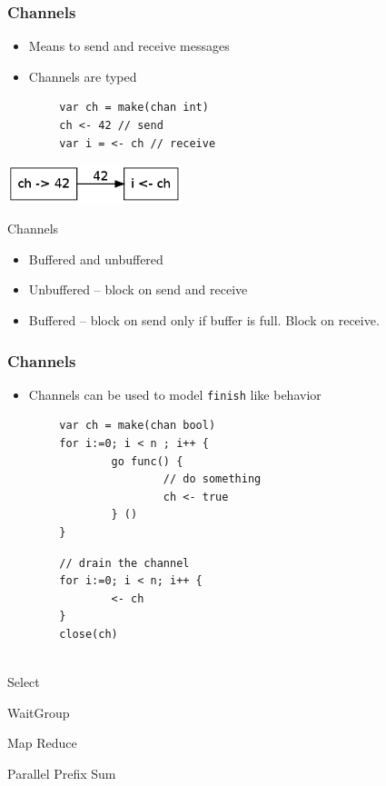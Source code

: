 \documentclass{beamer}
\begin{document}
\begin{frame} [fragile]
\frametitle{Channels}
\begin{itemize}
\item Means to send and receive messages
\item Channels are typed
\end{itemize}
\begin{verbatim}
        var ch = make(chan int) 
        ch <- 42 // send 
        var i = <- ch // receive        
\end{verbatim}
\begin{center}
\includegraphics[width=2in]{channel.png}
\end{center}
\end{frame}

\begin{frame}{Channels}

\begin{itemize}
\item Buffered and unbuffered
\item Unbuffered -- block on send and receive
\item Buffered  -- block on send only if buffer is full. Block on receive.

\end{itemize}
\end{frame}

\begin{frame}[fragile]
\frametitle{Channels}
\begin{itemize}
\item Channels can be used to model \verb=finish= like behavior
\end{itemize}
\begin{verbatim}
        var ch = make(chan bool)
        for i:=0; i < n ; i++ {
                go func() { 
                        // do something
                        ch <- true
                } ()
        }
\end{verbatim}
\pause
\begin{verbatim}
        // drain the channel
        for i:=0; i < n; i++ {
                <- ch
        }
        close(ch)
        
\end{verbatim}
\end{frame}

\begin{frame}{Select}
\end{frame}

\begin{frame} {WaitGroup}

\end{frame}

\begin{frame} {Map Reduce}
\end{frame}

\begin{frame} {Parallel Prefix Sum}
\end{frame}
\end{document}

